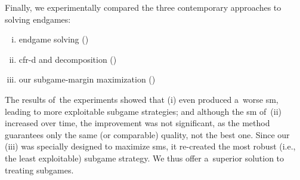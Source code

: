 Finally, we experimentally compared the three contemporary approaches to solving endgames:
\begin{enumerate}[(i)]
  \item endgame solving (\cite{Ganzfried2015endgame})
  \item \acrshort{cfr-d} and decomposition (\cite{BurchJohansonBowling2014})
  \item our subgame-margin maximization (\cite{Moravcik2016refining})
\end{enumerate}
The results of~the experiments showed that (i) even produced a~worse \acrshort{sm}, leading to more exploitable subgame strategies;
and although the \acrshort{sm} of~(ii) increased over time, the improvement was not significant, as the method guarantees only the same (or comparable) quality, not the best one.
Since our (iii) was specially designed to maximize \acrshort{sm}s, it re-created the most robust (i.e., the least exploitable) subgame strategy.
We thus offer a~superior solution to treating subgames.
